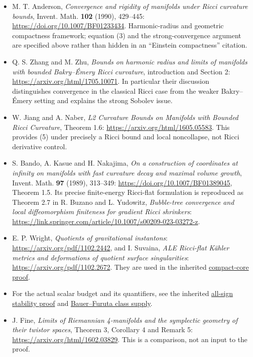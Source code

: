\documentclass[
  11pt,
]{article}
\providecommand{\tightlist}{%
  \setlength{\itemsep}{0pt}\setlength{\parskip}{0pt}}
\begin{document}
\begin{itemize}
\tightlist
\item
  M. T. Anderson, \emph{Convergence and rigidity of manifolds under
  Ricci curvature bounds}, Invent. Math. \textbf{102} (1990), 429--445:
  \url{https://doi.org/10.1007/BF01233434}. Harmonic-radius and
  geometric compactness framework; equation (3) and the
  strong-convergence argument are specified above rather than hidden in
  an ``Einstein compactness'' citation.
\item
  Q. S. Zhang and M. Zhu, \emph{Bounds on harmonic radius and limits of
  manifolds with bounded Bakry--Émery Ricci curvature}, introduction and
  Section 2: \url{https://arxiv.org/html/1705.10071}. In particular
  their discussion distinguishes convergence in the classical Ricci case
  from the weaker Bakry--Émery setting and explains the strong Sobolev
  issue.
\item
  W. Jiang and A. Naber, \emph{L2 Curvature Bounds on Manifolds with
  Bounded Ricci Curvature}, Theorem 1.6:
  \url{https://arxiv.org/html/1605.05583}. This provides (5) under
  precisely a Ricci bound and local noncollapse, not Ricci derivative
  control.
\item
  S. Bando, A. Kasue and H. Nakajima, \emph{On a construction of
  coordinates at infinity on manifolds with fast curvature decay and
  maximal volume growth}, Invent. Math. \textbf{97} (1989), 313--349:
  \url{https://doi.org/10.1007/BF01389045}, Theorem 1.5. Its precise
  finite-energy Ricci-flat formulation is reproduced as Theorem 2.7 in
  R. Buzano and L. Yudowitz, \emph{Bubble-tree convergence and local
  diffeomorphism finiteness for gradient Ricci shrinkers}:
  \url{https://link.springer.com/article/10.1007/s00209-023-03272-z}.
\item
  E. P. Wright, \emph{Quotients of gravitational instantons}:
  \url{https://arxiv.org/pdf/1102.2442}, and I. Suvaina, \emph{ALE
  Ricci-flat Kähler metrics and deformations of quotient surface
  singularities}: \url{https://arxiv.org/pdf/1102.2672}. They are used
  in the inherited
  \href{../mathematics/current/line1_aspherical_no_bubbles.md}{compact-core
  proof}.
\item
  For the actual scalar budget and its quantifiers, see the inherited
  \href{../mathematics/current/line1_integral_rigidity_paper.md}{all-sign
  stability proof} and
  \href{../mathematics/current/line1_bauer_furuta_geography.md}{Bauer--Furuta
  class supply}.
\item
  J. Fine, \emph{Limits of Riemannian 4-manifolds and the symplectic
  geometry of their twistor spaces}, Theorem 3, Corollary 4 and Remark
  5: \url{https://arxiv.org/html/1602.03829}. This is a comparison, not
  an input to the proof.
\end{itemize}
\end{document}
